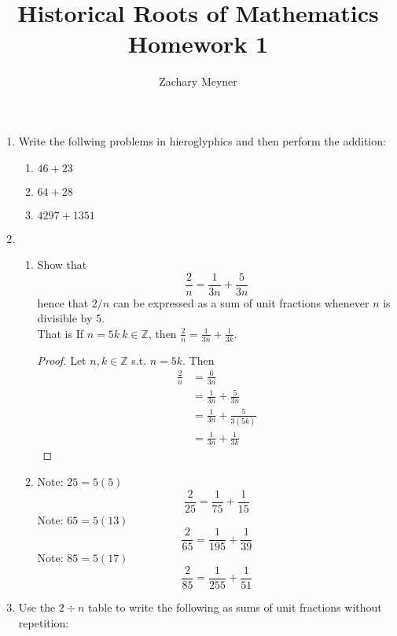 \documentclass[12pt]{article}
\title{\large Historical Roots of Mathematics Homework 1}
\author{\large Zachary Meyner}
\date{}
\newcommand\setitemnumber[1]{\setcounter{enumi}{\numexpr#1-- -1\relax}}
\begin{document}
\maketitle
\begin{enumerate}[label=\arabic*.]
    \setitemnumber{1}
    \item Write the follwing problems in hieroglyphics and then perform the addition:
    \begin{enumerate}[label=\alph*.]
        \item $46+23$ \vspace{50mm}
        \item $64+28$ \vspace{50mm}
        \item $4297+1351$ \vspace{50mm}
    \end{enumerate}
    \item 
    \begin{enumerate}[label=\alph*.]
        \item Show that 
        \[ \frac{2}{n} = \frac{1}{3n}+\frac{5}{3n} \]
        hence that $2/n$ can be expressed as a sum of unit fractions whenever $n$ is divisible by 5. \\
        That is 
        If $n=5k \ k \in \mathbb{Z}$, then $\displaystyle\frac{2}{n} = \displaystyle\frac{1}{3n} + \displaystyle\frac{1}{3k}$.
        \begin{proof}
            Let $n,k \in \mathbb{Z}$ s.t. $n = 5k$. Then
            \begin{align*}
                \frac{2}{n} &= \frac{6}{3n} \\
                &= \frac{1}{3n} + \frac{5}{3n} \\
                &= \frac{1}{3n} + \frac{5}{3(5k)} \\
                &= \frac{1}{3n} + \frac{1}{3k}
            \end{align*}
        \end{proof}
        \item Note: $25 = 5(5)$
        \[\frac{2}{25} = \frac{1}{75} + \frac{1}{15} \]
        Note: $65 = 5(13)$
        \[\frac{2}{65} = \frac{1}{195} + \frac{1}{39} \]
        Note: $85 = 5(17)$
        \[\frac{2}{85} = \frac{1}{255} + \frac{1}{51} \] 
    \end{enumerate}
    \item Use the $2 \div n$ table to write the following as sums of unit fractions without repetition:
    \begin{enumerate}[label=\alph*.]

\end{enumerate}
\end{enumerate}
\end{document}
